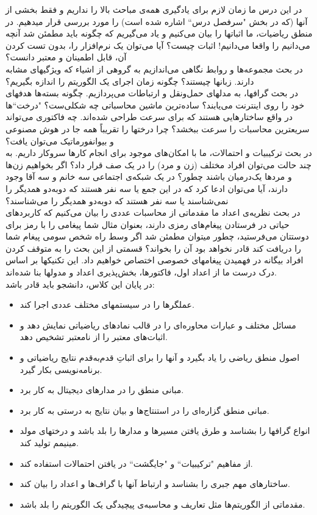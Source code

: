 \documentclass[a4paper]{arman-syllabus}
\begin{document}
{در این درس ما زمان لازم برای یادگیری همه‌ی مباحث بالا را نداریم و فقط بخشی از آنها (که در بخش "سرفصل درس`` اشاره شده است) را مورد بررسی قرار میدهیم. 
در منطق ریاضیات، ما اثباتها را بیان می‌کنیم و یاد می‌گیریم که چگونه باید مطمئن شد آنچه می‌دانیم را واقعا می‌دانیم! اثبات چیست؟ آیا می‌توان یک نرم‌افزار را، بدون تست کردن آن، قابل اطمینان و معتبر دانست؟ \\
در بحث مجموعه‌ها و روابط نگاهی می‌اندازیم به گروهی از اشیاء که ویژگیهای مشابه دارند. زبانها چیستند؟ چگونه زمان اجرای یک الگوریتم را اندازه بگیریم؟ \\
در بحث گرافها، به مدلهای حمل‌و‌نقل و ارتباطات می‌پردازیم. چگونه بسته‌ها هدفهای خود را روی اینترنت می‌یابند؟ ساده‌ترین ماشین محاسباتی چه شکلی‌ست؟  "درخت``ها در واقع ساختارهایی هستند که برای سرعت طراحی شده‌اند. چه فاکتوری می‌تواند سریعترین محاسبات را سرعت ببخشد؟ چرا درختها را تقریباً همه جا در هوش مصنوعی و بیو‌انفورماتیک می‌توان یافت؟ \\
در بحث ترکیبیات و احتمالات، ما با امکان‌های موجود برای انجام کارها سروکار داریم. به چند حالت می‌توان افراد مختلف (زن و مرد) را در یک صف قرار داد؟ اگر بخواهیم زن‌ها و مردها یک‌در‌میان باشند چطور؟ در یک شبکه‌ی اجتماعی سه خانم و سه آقا وجود دارند، آیا می‌توان ادعا کرد که در این جمع یا سه نفر هستند که دوبه‌دو همدیگر را نمی‌شناسند یا سه نفر هستند که دو‌به‌دو همدیگر را می‌شناسند؟ \\
در بحث نظریه‌ی اعداد ما مقدماتی از محاسبات عددی را بیان می‌کنیم که کاربردهای حیاتی در فرستادن پیغام‌های رمزی دارند، بعنوان مثال شما پیغامی را با رمز برای دوستتان می‌فرستید، چطور میتوان مطمئن شد اگر وسط راه شخص سومی پیغام شما را دریافت کند قادر نخواهد بود آن را بخواند؟ قسمتی از این بحث را به متوقف کردن افراد بیگانه در فهمیدن پیغامهای خصوصی اختصاص خواهیم داد. این تکنیکها بر اساس درک درست ما از اعداد اول، فاکتورها، بخش‌پذیری اعداد و مدولها بنا شده‌اند. \\

در پایان این کلاس،‌ دانشجو باید قادر باشد:
\begin{itemize}
\item عملگرها را در سیستمهای مختلف عددی اجرا کند.
\item مسائل مختلف و عبارات محاوره‌ای را در قالب  نمادهای ریاضیاتی نمایش دهد و اثبات‌های معتبر را از نامعتبر تشخیص دهد.
\item اصول منطق ریاضی را یاد بگیرد و آنها را برای اثباتِ قدم‌به‌قدم نتایج ریاضیاتی و برنامه‌نویسی بکار گیرد.
\item مبانی منطق را در مدارهای دیجیتال به کار برد.
\item مبانی منطق گزاره‌ای را در استنتاج‌ها و بیان نتایج به درستی به کار برد.
\item انواع گرافها را بشناسد و طرق یافتن مسیرها و  مدارها را بلد باشد و درختهای مولد مینیمم تولید کند.
\item از مفاهیم "ترکیبیات`` و "جایگشت`` در یافتن احتمالات استفاده کند.
\item ساختارهای مهم جبری را بشناسد و ارتباط آنها با گراف‌ها و اعداد را بیان کند.
\item مقدماتی از الگوریتم‌ها مثل تعاریف و محاسبه‌ی پیچیدگی یک الگوریتم را بلد باشد.
\end{itemize}

}
\end{document}

